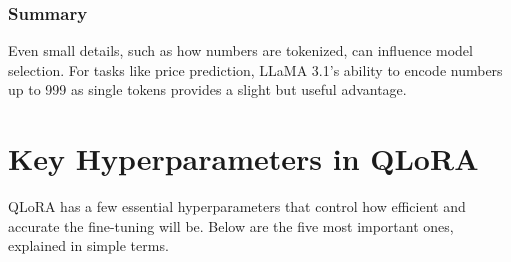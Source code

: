\documentclass[a4paper, 12pt]{article}
\begin{document}
\subsubsection*{Summary}
\begin{tcolorbox}[colback=blue!5!white,colframe=blue!75!black,title=Takeaway]
Even small details, such as how numbers are tokenized, can influence model selection.  
For tasks like price prediction, LLaMA 3.1's ability to encode numbers up to 999 as single tokens provides a slight but useful advantage.
\end{tcolorbox}

\newpage

\newpage
\section*{Key Hyperparameters in QLoRA}

QLoRA has a few essential hyperparameters that control how efficient and accurate the fine-tuning will be.  
Below are the five most important ones, explained in simple terms.
\end{document}
